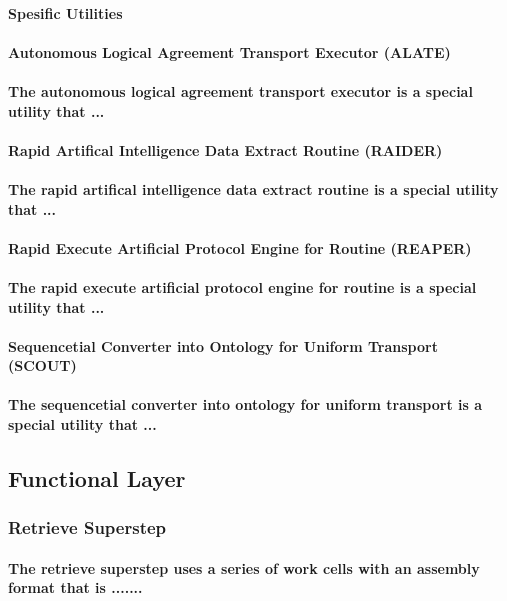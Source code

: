 \documentclass{acm_proc_article-sp}
\begin{document}
\paragraph{Spesific Utilities}
\paragraph{\textbf{Autonomous Logical Agreement Transport Executor (ALATE)}}
\paragraph{The autonomous logical agreement transport executor is a special utility that ... }
\paragraph{\textbf{Rapid Artifical Intelligence Data Extract Routine (RAIDER)}}
\paragraph{The rapid artifical intelligence data extract routine is a special utility that ... }
\paragraph{\textbf{Rapid Execute Artificial Protocol Engine for Routine (REAPER)}}
\paragraph{The rapid execute artificial protocol engine for routine is a special utility that ... }
\paragraph{\textbf{Sequencetial Converter into Ontology for Uniform Transport (SCOUT)}}
\paragraph{The sequencetial converter into ontology for uniform transport is a special utility that ... }
\subsection{Functional Layer}
\subsubsection{Retrieve Superstep}
\paragraph{The retrieve superstep uses a series of work cells with an assembly format that is .......}
\end{document}
